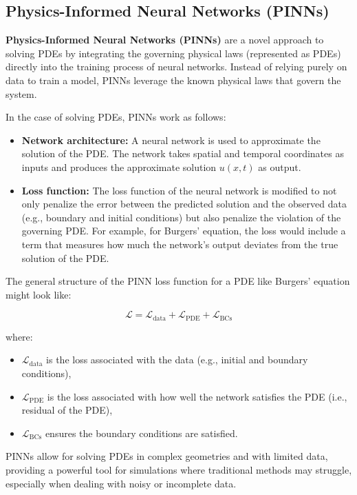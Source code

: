 \documentclass[conference]{IEEEtran}
\begin{document}
\subsection{Physics-Informed Neural Networks (PINNs)}

\textbf{Physics-Informed Neural Networks (PINNs)} are a novel approach to solving PDEs by integrating the governing physical laws (represented as PDEs) directly into the training process of neural networks. Instead of relying purely on data to train a model, PINNs leverage the known physical laws that govern the system.

In the case of solving PDEs, PINNs work as follows:
\begin{itemize}
    \item \textbf{Network architecture:} A neural network is used to approximate the solution of the PDE. The network takes spatial and temporal coordinates as inputs and produces the approximate solution \(u(x,t)\) as output.
    \item \textbf{Loss function:} The loss function of the neural network is modified to not only penalize the error between the predicted solution and the observed data (e.g., boundary and initial conditions) but also penalize the violation of the governing PDE. For example, for Burgers' equation, the loss would include a term that measures how much the network's output deviates from the true solution of the PDE.
\end{itemize}

The general structure of the PINN loss function for a PDE like Burgers' equation might look like:

\[
\mathcal{L} = \mathcal{L}_{\text{data}} + \mathcal{L}_{\text{PDE}} + \mathcal{L}_{\text{BCs}}
\]

where:
\begin{itemize}
    \item \(\mathcal{L}_{\text{data}}\) is the loss associated with the data (e.g., initial and boundary conditions),
    \item \(\mathcal{L}_{\text{PDE}}\) is the loss associated with how well the network satisfies the PDE (i.e., residual of the PDE),
    \item \(\mathcal{L}_{\text{BCs}}\) ensures the boundary conditions are satisfied.
\end{itemize}

PINNs allow for solving PDEs in complex geometries and with limited data, providing a powerful tool for simulations where traditional methods may struggle, especially when dealing with noisy or incomplete data.
\end{document}
